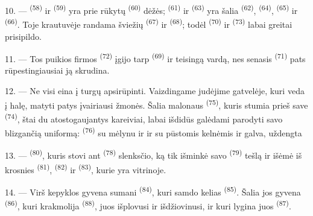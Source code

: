 10. ---  \textsuperscript{(58)} ir 
\textsuperscript{(59)} yra prie rūkytų  \textsuperscript{(60)} dėžės;
 \textsuperscript{(61)} ir  \textsuperscript{(63)} yra
šalia  \textsuperscript{(62)},  \textsuperscript{(64)},
 \textsuperscript{(65)} ir 
\textsuperscript{(66)}. Toje krautuvėje randama šviežių 
\textsuperscript{(67)} ir  \textsuperscript{(68)}; todėl
 \textsuperscript{(70)} ir 
\textsuperscript{(73)} labai greitai prisipildo.

11. --- Tos puikios firmos  \textsuperscript{(72)} įgijo tarp
 \textsuperscript{(69)} ir  teisingą vardą, nes
senasis  \textsuperscript{(71)} pats rūpestingiausiai ją skrudina.

\VUsaut{4.0mm}
\VUsaut{3.0mm}

12. --- Ne visi eina į turgų apsirūpinti. Vaizdingame judėjime gatvelėje, kuri veda
į halę, matyti patys įvairiausi žmonės. Šalia malonaus 
\textsuperscript{(75)}, kuris stumia prieš save  \textsuperscript{(74)},
štai du atostogaujantys kareiviai, labai išdidūs galėdami parodyti savo blizgančią
uniformą:  \textsuperscript{(76)} su mėlynu  ir
 ir  su pūstomis kelnėmis ir galva,
uždengta 

13. ---  \textsuperscript{(80)}, kuris stovi ant 
\textsuperscript{(78)} slenksčio, ką tik išminkė savo 
\textsuperscript{(79)} tešlą ir išėmė iš krosnies 
\textsuperscript{(81)},  \textsuperscript{(82)} ir
 \textsuperscript{(83)}, kurie yra vitrinoje.

14. --- Virš kepyklos gyvena sumani  \textsuperscript{(84)},
kuri samdo kelias  \textsuperscript{(85)}. Šalia jos gyvena
 \textsuperscript{(86)}, kuri krakmolija
 \textsuperscript{(88)}, juos išplovusi ir išdžiovinusi, ir kuri
lygina juos  \textsuperscript{(87)}.

\VUsaut{4.0mm}
\VUsaut{3.0mm}

